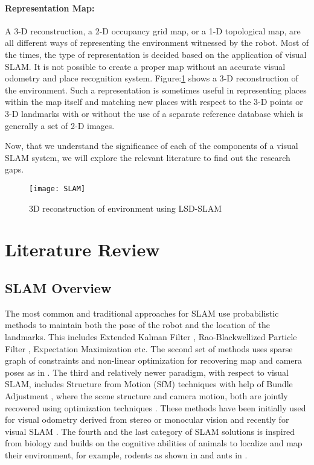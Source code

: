 \documentclass{article}
\begin{document}
\paragraph{Representation Map:}
A 3-D reconstruction, a 2-D occupancy grid map, or a 1-D topological map, are all different ways of representing the environment witnessed by the robot. Most of the times, the type of representation is decided based on the application of visual SLAM. It is not possible to create a proper map without an accurate visual odometry and place recognition system. Figure:\ref{fig:slamExample} shows a 3-D reconstruction of the environment. Such a representation is sometimes useful in representing places within the map itself and matching new places with respect to the 3-D points or 3-D landmarks with or without the use of a separate reference database which is generally a set of 2-D images.

Now, that we understand the significance of each of the components of a visual SLAM system, we will explore the relevant literature to find out the research gaps.


\begin{figure}[htbp]
\centering
 \texttt{[image: SLAM]}
 \caption{3D reconstruction of environment using LSD-SLAM \cite{Engel2014lsd}}
 \label{fig:slamExample}
\end{figure}

\section{Literature Review}
\subsection{SLAM Overview}
The most common and traditional approaches for SLAM use probabilistic methods to maintain both the pose of the robot and the location of the landmarks. This includes Extended Kalman Filter \cite{Chatila1985}, Rao-Blackwellized Particle Filter \cite{montemerlo2007fastslam}, Expectation Maximization \cite{thrun2005probabilistic} etc. The second set of methods uses sparse graph of constraints and non-linear optimization for recovering map and camera poses as in \cite{Olson2006, Thrun2006, Sunderhauf2012b}. The third and relatively newer paradigm, with respect to visual SLAM, includes Structure from Motion (SfM) \cite{beardsley1997sequential} techniques with help of Bundle Adjustment \cite{Triggs2000}, where the scene structure and camera motion, both are jointly recovered using optimization techniques \cite{Strasdat2010}. These methods have been initially used for visual odometry derived from stereo \cite{Nister2004, Pollefeys2004} or monocular vision \cite{Gr2015, Klein2007, Nister2004, Strasdat2010} and recently for visual SLAM \cite{Mur-Artal2015,Mouragnon2006}. The fourth and the last category of SLAM solutions is inspired from biology \cite{milford2008robot} and builds on the cognitive abilities of animals to localize and map their environment, for example, rodents as shown in \cite{Milford2004} and ants in \cite{Collett2010}.
\end{document}
